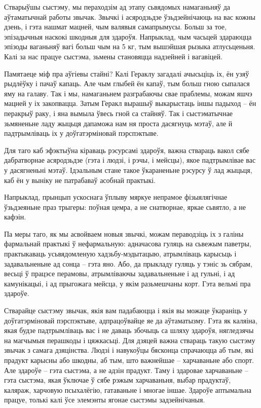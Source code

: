 Стварыўшы сыстэму, мы пераходзім ад этапу сьвядомых намаганьняў да аўтаматычнай работы звычак. Звычкі і асяродзьдзе ўзьдзейнічаюць на вас кожны дзень, і гэта нашмат мацней, чым валявыя самапрымусы. Больш за тое, эпізадычныя наскокі шкодныя для здароўя. Напрыклад, чым часьцей здараюцца эпізоды ваганьняў вагі больш чым на 5 кг, тым вышэйшая рызыка атлусьценьня. Калі за нас працуе сыстэма, зьмены становяцца надзейней і вагавіцей.

Памятаеце міф пра аўгіевы стайні? Калі Гераклу загадалі ачысьціць іх, ён узяў рыдлёўку і пачаў капаць. Але чым глыбей ён капаў, тым больш гною сыпалася яму на галаву. Так і мы, намаганьнем разграбаючы свае праблемы, можам яшчэ мацней у іх закопвацца. Затым Геракл вырашыў выкарыстаць іншы падыход – ён перакрыў раку, і яна вымыла ўвесь гной са стайняў. Так і сыстэматычнае зьмяненьне ладу жыцьця дапаможа нам ня проста дасягнуць мэтаў, але й падтрымліваць іх у доўгатэрміновай пэрспэктыве.

Для таго каб эфэктыўна кіраваць рэсурсамі здароўя, важна ствараць вакол сябе дабратворнае асяродзьдзе (гэта і людзі, і рэчы, і мейсцы), якое падтрымлівае вас у дасягненьні мэтаў. Ідэальным стане такое ўкараненьне рэсурсу ў лад жыцьця, каб ён у выніку не патрабаваў асобнай практыкі.

Напрыклад, прынцып ускоснага ўплыву мяркуе непрамое фізыялягічнае ўзьдзеяньне праз трыгеры: поўная цемра, а не снатворнае, яркае сьвятло, а не кафэін.

Па меры таго, як мы асвойваем новыя звычкі, можам пераводзіць іх з галіны фармальнай практыкі ў нефармальную: адначасова гуляць на сьвежым паветры, практыкаваць усьвядомленую хадзьбу-мэдытацыю, атрымліваць карысьць і задавальненьне ад сонца – гэта яно. Або, да прыкладу гуляць у тэніс зь сябрам, весьці ў працэсе перамовы, атрымліваючы задавальненьне і ад гульні, і ад камунікацыі, і ад прыгожага мейсца, у якім разьмешчаны корт. Гэта вельмі пра здароўе.

Стварайце сыстэму звычак, якія вам падабаюцца і якія вы можаце ўкараніць у доўгатэрміновай пэрспэктыве, адпрацоўвайце яе да аўтаматызму. Гэта як каляіна, якая будзе падтрымліваць вас і не даваць збочыць са шляху здароўя, нягледзячы на магчымыя перашкоды і цяжкасьці. Для дзяцей важна ствараць такую сыстэму звычак з самага дзяцінства. Людзі і навукоўцы бясконца спрачаюцца аб тым, які прадукт карысны або шкодны, аб тым, што важнейшае – харчаваньне або спорт. Але здароўе – гэта сыстэма, а не адзін прадукт. Таму і здаровае харчаваньне – гэта сыстэма, якая ўключае ў сябе рэжым харчаваньня, выбар прадуктаў, каляраж, харчовую псыхалёгію, гатаваньне і многае іншае. Здароўе аптымальна працуе, толькі калі ўсе элемэнты ягонае сыстэмы задзейнічаныя.

